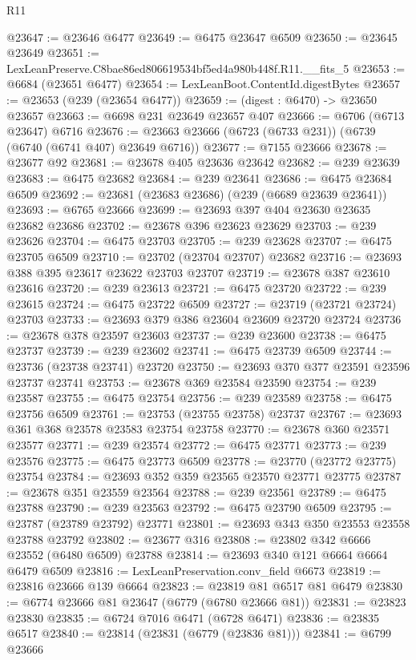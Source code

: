 \begin{lexlean}{R11}
\begin{coremodule}
@23647 := @23646 @6477
@23649 := @6475 @23647 @6509
@23650 := @23645 @23649
@23651 := LexLeanPreserve.C8bae86ed806619534bf5ed4a980b448f.R11.__fits_5
@23653 := @6684 (@23651 @6477)
@23654 := LexLeanBoot.ContentId.digestBytes
@23657 := @23653 (@239 (@23654 @6477))
@23659 := (digest : @6470) -> @23650 @23657
@23663 := @6698 @231 @23649 @23657 @407
@23666 := @6706 (@6713 @23647) @6716
@23676 := @23663 @23666 (@6723 (@6733 @231)) (@6739 (@6740 (@6741 @407) @23649 @6716))
@23677 := @7155 @23666
@23678 := @23677 @92
@23681 := @23678 @405 @23636 @23642
@23682 := @239 @23639
@23683 := @6475 @23682
@23684 := @239 @23641
@23686 := @6475 @23684 @6509
@23692 := @23681 (@23683 @23686) (@239 (@6689 @23639 @23641))
@23693 := @6765 @23666
@23699 := @23693 @397 @404 @23630 @23635 @23682 @23686
@23702 := @23678 @396 @23623 @23629
@23703 := @239 @23626
@23704 := @6475 @23703
@23705 := @239 @23628
@23707 := @6475 @23705 @6509
@23710 := @23702 (@23704 @23707) @23682
@23716 := @23693 @388 @395 @23617 @23622 @23703 @23707
@23719 := @23678 @387 @23610 @23616
@23720 := @239 @23613
@23721 := @6475 @23720
@23722 := @239 @23615
@23724 := @6475 @23722 @6509
@23727 := @23719 (@23721 @23724) @23703
@23733 := @23693 @379 @386 @23604 @23609 @23720 @23724
@23736 := @23678 @378 @23597 @23603
@23737 := @239 @23600
@23738 := @6475 @23737
@23739 := @239 @23602
@23741 := @6475 @23739 @6509
@23744 := @23736 (@23738 @23741) @23720
@23750 := @23693 @370 @377 @23591 @23596 @23737 @23741
@23753 := @23678 @369 @23584 @23590
@23754 := @239 @23587
@23755 := @6475 @23754
@23756 := @239 @23589
@23758 := @6475 @23756 @6509
@23761 := @23753 (@23755 @23758) @23737
@23767 := @23693 @361 @368 @23578 @23583 @23754 @23758
@23770 := @23678 @360 @23571 @23577
@23771 := @239 @23574
@23772 := @6475 @23771
@23773 := @239 @23576
@23775 := @6475 @23773 @6509
@23778 := @23770 (@23772 @23775) @23754
@23784 := @23693 @352 @359 @23565 @23570 @23771 @23775
@23787 := @23678 @351 @23559 @23564
@23788 := @239 @23561
@23789 := @6475 @23788
@23790 := @239 @23563
@23792 := @6475 @23790 @6509
@23795 := @23787 (@23789 @23792) @23771
@23801 := @23693 @343 @350 @23553 @23558 @23788 @23792
@23802 := @23677 @316
@23808 := @23802 @342 @6666 @23552 (@6480 @6509) @23788
@23814 := @23693 @340 @121 @6664 @6664 @6479 @6509
@23816 := LexLeanPreservation.conv_field @6673
@23819 := @23816 @23666 @139 @6664
@23823 := @23819 @81 @6517 @81 @6479
@23830 := @6774 @23666 @81 @23647 (@6779 (@6780 @23666 @81))
@23831 := @23823 @23830
@23835 := @6724 @7016 @6471 (@6728 @6471)
@23836 := @23835 @6517
@23840 := @23814 (@23831 (@6779 (@23836 @81)))
@23841 := @6799 @23666

\end{coremodule}
\end{lexlean}
